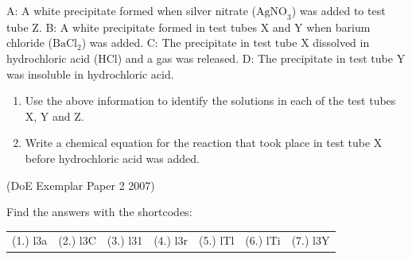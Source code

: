 \begin{enumerate}[noitemsep, label=\textbf{\arabic*}. ]
A: A white precipitate formed when silver nitrate (${\mathrm{AgNO}}_{3}$) was added to test tube Z.
B: A white precipitate formed in test tubes X and Y when barium chloride (${\mathrm{BaCl}}_{2}$) was added.
C: The precipitate in test tube X dissolved in hydrochloric acid ($\mathrm{HCl}$) and a gas was released.
D: The precipitate in test tube Y was insoluble in hydrochloric acid.
\label{m38719*id343466}\begin{enumerate}[noitemsep, label=\textbf{\alph*}. ] 
            \label{m38719*uid128}\item Use the above information to identify the solutions in each of the test tubes X, Y and Z.
\label{m38719*uid129}\item Write a chemical equation for the reaction that took place in test tube X before hydrochloric acid was added.
\end{enumerate}
(DoE Exemplar Paper 2 2007)
\end{enumerate}
\label{m38719**end}
  \label{4c7ba3bfe702f176850b0d58ba743465**end}
\par {} Find the answers with the shortcodes:
 \par \begin{tabular}[h]{cccccc}
 (1.) l3a  &  (2.) l3C  &  (3.) l31  &  (4.) l3r  &  (5.) lTl  &  (6.) lTi  &  (7.) l3Y  & \end{tabular}
